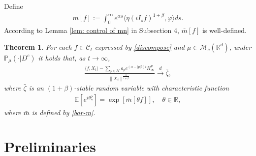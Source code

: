 \documentclass[12pt,a4paper]{amsart}
\theoremstyle{plain}
\newtheorem{thm}{Theorem}[section]
\theoremstyle{definition}
\numberwithin{equation}{section}
\begin{document}
Define
\begin{align}\label{bar-m}
   \bar{m}[f]:=\int_{0}^{\infty} e^{\alpha s}\langle \eta(iI_sf)^{1+\beta},\varphi\rangle ds.
\end{align}
According to Lemma \ref{lem: control of mn} in Subsection 4, $\bar{m}[f]$ is well-defined.
\begin{thm}\label{theorem 1.6}
For each $f\in\mathcal{C}_l$ expressed by \eqref{discompose} and $\mu\in \mathcal{M}_c(\mathbb{R}^d)$, under $\mathbb{P}_{\mu}(\cdot|D^c)$ it holds that, as $t\to\infty$,
\begin{align}\label{thm: large rate}
    \frac{\langle f, X_t\rangle-\sum_{p\in\mathcal{N}}a_pe^{(\alpha-|p|b)t}H^p_{\infty}}{\|X_t\|^\frac{1}{1+\beta}}\xrightarrow{d}\bar{\zeta},
\end{align}
where $\bar{\zeta}$ is an $(1+\beta)$-stable random variable with characteristic function
\begin{align}
    \mathbb{E}[e^{i\theta\bar{\zeta}}]=\exp[\bar{m}[\theta f]],\quad \theta\in \mathbb{R},
\end{align}
where $\bar{m}$ is defined by \eqref{bar-m}.
\end{thm}

\section{Preliminaries}
\end{document}
